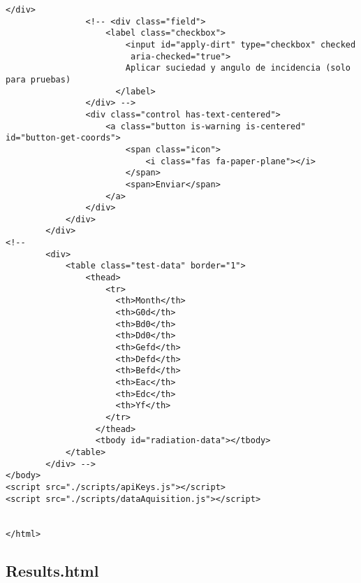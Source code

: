 \begin{lstlisting}[style=ES6, caption={public/index.html}]
                </div>
                <!-- <div class="field">
                    <label class="checkbox">
                        <input id="apply-dirt" type="checkbox" checked
                         aria-checked="true">
                        Aplicar suciedad y angulo de incidencia (solo para pruebas)
                      </label>
                </div> -->
                <div class="control has-text-centered">
                    <a class="button is-warning is-centered" id="button-get-coords">
                        <span class="icon">
                            <i class="fas fa-paper-plane"></i>
                        </span>
                        <span>Enviar</span>
                    </a>
                </div>
            </div>
        </div>
<!--         
        <div>
            <table class="test-data" border="1">
                <thead>
                    <tr>
                      <th>Month</th>
                      <th>G0d</th>
                      <th>Bd0</th>
                      <th>Dd0</th>
                      <th>Gefd</th>
                      <th>Defd</th>
                      <th>Befd</th>
                      <th>Eac</th>
                      <th>Edc</th>
                      <th>Yf</th>
                    </tr>
                  </thead>
                  <tbody id="radiation-data"></tbody>
            </table>
        </div> -->
</body>
<script src="./scripts/apiKeys.js"></script>
<script src="./scripts/dataAquisition.js"></script>


</html>

\end{lstlisting}

\subsection{Results.html}

